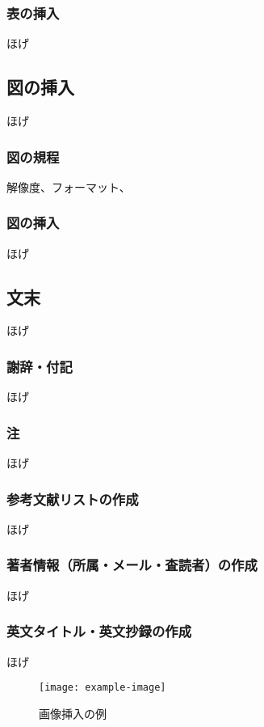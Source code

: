 \documentclass[]{sociologos}
\begin{document}
\subsubsection{表の挿入}
ほげ
\subsection{図の挿入}
ほげ
\subsubsection{図の規程}
解像度、フォーマット、

\subsubsection{図の挿入}
ほげ
\subsection{文末}
ほげ
\subsubsection{謝辞・付記}
ほげ
\subsubsection{注}
ほげ
\subsubsection{参考文献リストの作成}
ほげ
\subsubsection{著者情報（所属・メール・査読者）の作成}
ほげ
\subsubsection{英文タイトル・英文抄録の作成}
ほげ


\begin{figure}[!htbp]
\centering
\texttt{[image: example-image]}\\
\caption{画像挿入の例}
\end{figure}
\end{document}
